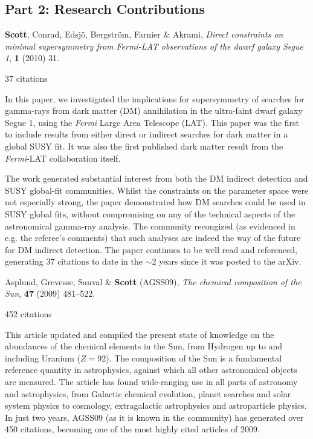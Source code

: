 \documentclass[10pt,twoside,twocolumn,a4paper]{article}
\def\it{\slshape}
\def\bf{\bfseries}
\begin{document}
\vspace{4mm}
\subsection*{Part 2: Research Contributions}

\cite{Scott09c} \textbf{Scott}, Conrad, Edsj{\"o}, Bergstr{\"o}m, Farnier \&  Akrami, {\it{Direct constraints on minimal supersymmetry from Fermi-LAT observations of the dwarf galaxy Segue 1}},  {\em \jcap} {\bf 1} (2010) 31.

\hfill 37 citations
\vspace{2mm}

In this paper, we investigated the implications for supersymmetry of searches for gamma-rays from dark matter (DM) annihilation in the ultra-faint dwarf galaxy Segue 1, using the \textit{Fermi} Large Area Telescope (LAT).  This paper was the first to include results from either direct or indirect searches for dark matter in a global SUSY fit.  It was also the first published dark matter result from the \textit{Fermi}-LAT collaboration itself.  

The work generated substantial interest from both the DM indirect detection and SUSY global-fit communities.  Whilst the constraints on the parameter space were not especially strong, the paper demonstrated how DM searches could be used in SUSY global fits, without compromising on any of the technical aspects of the astronomical gamma-ray analysis.  The community recongized (as evidenced in e.g. the referee's comments) that such analyses are indeed the way of the future for DM indirect detection.  The paper continues to be well read and referenced, generating 37 citations to date in the $\sim$2 years since it was posted to the arXiv.
\vspace{4mm}

\noindent \cite{AGSS} Asplund, Grevesse, Sauval \& \textbf{Scott} (AGSS09), {\it {The chemical composition of the Sun}},  {\em \araa} {\bf 47} (2009) 481--522.

\hfill 452 citations
\vspace{2mm}

This article updated and compiled the present state of knowledge on the abundances of the chemical elements in the Sun, from Hydrogen up to and including Uranium ($Z=92$).  The composition of the Sun is a fundamental reference quantity in astrophysics, against which all other astronomical objects are measured.  The article has found wide-ranging use in all parts of astronomy and astrophysics, from Galactic chemical evolution, planet searches and solar system physics to cosmology, extragalactic astrophysics and astroparticle physics.  In just two years, AGSS09 (as it is known in the community) has generated over 450 citations, becoming one of the most highly cited articles of 2009.
\end{document}
